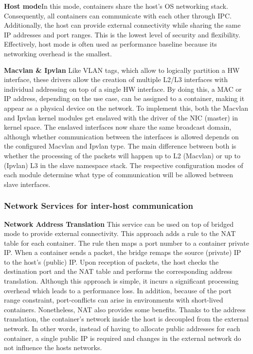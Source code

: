 \documentclass[conference]{IEEEtran}
\begin{document}
\noindent\textbf{Host mode}\hspace{0.2cm}In this mode, containers share the host's OS networking stack. Consequently, all containers can communicate with each other through IPC. Additionally, the host can provide external connectivity while sharing the same IP addresses and port ranges. This is the lowest level of security and flexibility. Effectively, host mode is often used as performance baseline because its networking overhead is the smallest.

\noindent\textbf{Macvlan \& Ipvlan}\hspace{0.2cm} Like VLAN tags, which allow to logically partition a HW interface, these drivers allow the creation of multiple L2/L3 interfaces with individual addressing on top of a single HW interface. By doing this, a MAC or IP address, depending on the use case, can be assigned to a container, making it appear as a physical device on the network. To implement this, both the Macvlan and Ipvlan kernel modules get enslaved with the driver of the NIC (master) in kernel space. The enslaved interfaces now share the same broadcast domain, although whether communication between the interfaces is allowed depends on the configured Macvlan and Ipvlan type. The main difference between both is whether the processing of the packets will happen up to L2 (Macvlan) or up to (Ipvlan) L3 in the slave namespace stack. The respective configuration modes of each module determine what type of communication will be allowed between slave interfaces.


\subsubsection{Network Services for inter-host communication}\hfill\break
\textbf{Network Address Translation}\hspace{0.2cm} This service can be used on top of bridged mode to provide external connectivity. This approach adds a rule to the NAT table for each container. The rule then maps a port number to a container private IP. When a container sends a packet, the bridge remaps the source (private) IP to the host's (public) IP. Upon reception of packets, the host checks the destination port and the NAT table and performs the corresponding address translation. Although this approach is simple, it incurs a significant processing overhead which leads to a performance loss. In addition, because of the port range constraint, port-conflicts can arise in environments with short-lived containers. Nonetheless, NAT also provides some benefits. Thanks to the address translation, the container's network inside the host is decoupled from the external network. In other words, instead of having to allocate public addresses for each container, a single public IP is required and changes in the external network do not influence the hosts networks.
\end{document}

